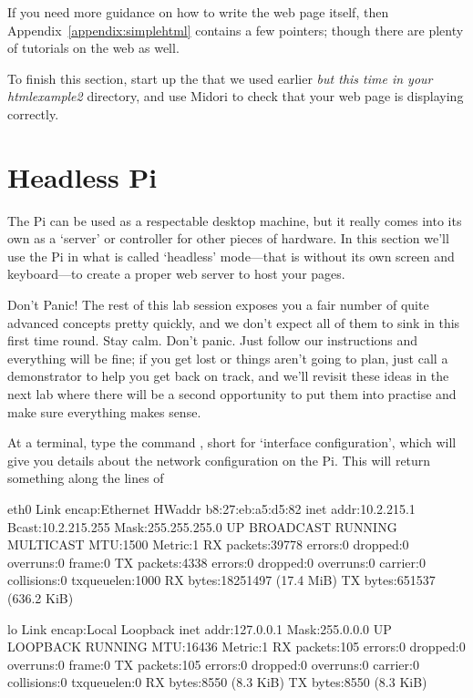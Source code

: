 If you need more guidance on how to write the web page itself, then Appendix~\ref{appendix:simplehtml} contains a few pointers; though there are plenty of tutorials on the web as well. 

To finish this section, start up the  that we used earlier \textit{but this time in your htmlexample2} directory, and use Midori to check that your web page is displaying correctly.

\section{Headless Pi}
\label{section:headless}



The Pi can be used as a respectable desktop machine, but it really comes into its own as a `server' or controller for other pieces of hardware. In this section we'll use the Pi in what is called `headless' mode---that is without its own screen and keyboard---to create a proper web server to host your pages. 

\begin{danger}{Don't Panic!}
The rest of this lab session exposes you a fair number of quite advanced concepts pretty quickly, and we don't expect all of them to sink in this first time round. Stay calm.  Don't panic. Just follow our instructions and everything will be fine; if you get lost or things aren't going to plan, just call a demonstrator to help you get back on track, and we'll revisit these ideas in the next lab where there will be a second opportunity to put them into practise and make sure everything makes sense.
\end{danger}

At a terminal, type the command , short for `interface configuration', which will give you details about the network configuration on the Pi. This will return something along the lines of

\begin{ttoutenv}
eth0      Link encap:Ethernet  HWaddr b8:27:eb:a5:d5:82
          inet addr:10.2.215.1  Bcast:10.2.215.255  Mask:255.255.255.0
          UP BROADCAST RUNNING MULTICAST  MTU:1500  Metric:1
          RX packets:39778 errors:0 dropped:0 overruns:0 frame:0
          TX packets:4338 errors:0 dropped:0 overruns:0 carrier:0
          collisions:0 txqueuelen:1000
          RX bytes:18251497 (17.4 MiB)  TX bytes:651537 (636.2 KiB)

lo        Link encap:Local Loopback
          inet addr:127.0.0.1  Mask:255.0.0.0
          UP LOOPBACK RUNNING  MTU:16436  Metric:1
          RX packets:105 errors:0 dropped:0 overruns:0 frame:0
          TX packets:105 errors:0 dropped:0 overruns:0 carrier:0
          collisions:0 txqueuelen:0
          RX bytes:8550 (8.3 KiB)  TX bytes:8550 (8.3 KiB)
\end{ttoutenv}

